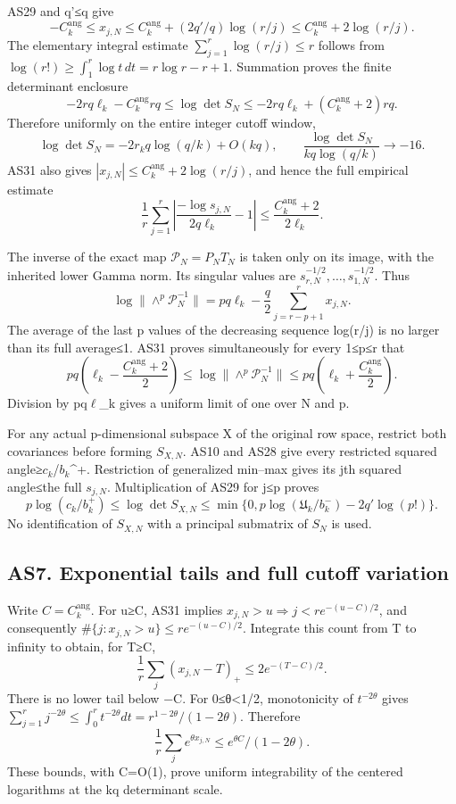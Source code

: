 \documentclass[11pt]{article}
\begin{document}
AS29 and q'≤q give \[
-C_k^{\mathrm{ang}}\le x_{j,N}
\le C_k^{\mathrm{ang}}+(2q'/q)\log(r/j)
\le C_k^{\mathrm{ang}}+2\log(r/j).
\tag{AS31}
\] The elementary integral estimate \(\sum_{j=1}^r\log(r/j)\le r\) follows from \(\log(r!)\ge\int_1^r\log t\,dt=r\log r-r+1\). Summation proves the finite determinant enclosure \[
-2rq\ell_k-C_k^{\mathrm{ang}}rq
\le\log\det S_N
\le-2rq\ell_k+(C_k^{\mathrm{ang}}+2)rq.
\tag{AS32}
\] Therefore uniformly on the entire integer cutoff window, \[
\log\det S_N=-2r_kq\log(q/k)+O(kq),\qquad
\frac{\log\det S_N}{kq\log(q/k)}\longrightarrow-16.
\tag{AS33}
\] AS31 also gives \(|x_{j,N}|\le C_k^{\mathrm{ang}}+2\log(r/j)\), and hence the full empirical estimate \[
\frac1r\sum_{j=1}^r
\left|\frac{-\log s_{j,N}}{2q\ell_k}-1\right|
\le\frac{C_k^{\mathrm{ang}}+2}{2\ell_k}.
\tag{AS34}
\]

The inverse of the exact map \(\mathcal P_N=P_NT_N\) is taken only on its image, with the inherited lower Gamma norm. Its singular values are \(s_{r,N}^{-1/2},\ldots,s_{1,N}^{-1/2}\). Thus \[
\log\|\wedge^p\mathcal P_N^{-1}\|
=pq\ell_k-\frac q2\sum_{j=r-p+1}^r x_{j,N}.
\] The average of the last p values of the decreasing sequence log(r/j) is no larger than its full average≤1. AS31 proves simultaneously for every 1≤p≤r that \[
pq\left(\ell_k-\frac{C_k^{\mathrm{ang}}+2}{2}\right)
\le\log\|\wedge^p\mathcal P_N^{-1}\|
\le pq\left(\ell_k+\frac{C_k^{\mathrm{ang}}}{2}\right).
\tag{AS35}
\] Division by pq\(\ell\)\_k gives a uniform limit of one over N and p.

For any actual p-dimensional subspace X of the original row space, restrict both covariances before forming \(S_{X,N}\). AS10 and AS28 give every restricted squared angle≥\(c_k\)/\(b_k\)\^{}+. Restriction of generalized min--max gives its jth squared angle≤the full \(s_{j,N}\). Multiplication of AS29 for j≤p proves \[
p\log(c_k/b_k^+)\le\log\det S_{X,N}
\le\min\{0,p\log(\mathfrak U_k/b_k^-)-2q'\log(p!)\}.
\tag{AS36}
\] No identification of \(S_{X,N}\) with a principal submatrix of \(S_N\) is used.

\subsection{AS7. Exponential tails and full cutoff variation}\label{as7.-exponential-tails-and-full-cutoff-variation}

Write \(C=C_k^{\mathrm{ang}}\). For u≥C, AS31 implies \(x_{j,N}>u\Rightarrow j<r e^{-(u-C)/2}\), and consequently \(\#\{j:x_{j,N}>u\}\le r e^{-(u-C)/2}\). Integrate this count from T to infinity to obtain, for T≥C, \[
\frac1r\sum_j(x_{j,N}-T)_+
\le2e^{-(T-C)/2}.
\tag{AS37}
\] There is no lower tail below −C. For 0≤θ\textless1/2, monotonicity of \(t^{-2\theta}\) gives \(\sum_{j=1}^r j^{-2\theta}\le\int_0^r t^{-2\theta}dt
=r^{1-2\theta}/(1-2\theta)\). Therefore \[
\frac1r\sum_j e^{\theta x_{j,N}}
\le e^{\theta C}/(1-2\theta).
\tag{AS38}
\] These bounds, with C=O(1), prove uniform integrability of the centered logarithms at the kq determinant scale.
\end{document}
